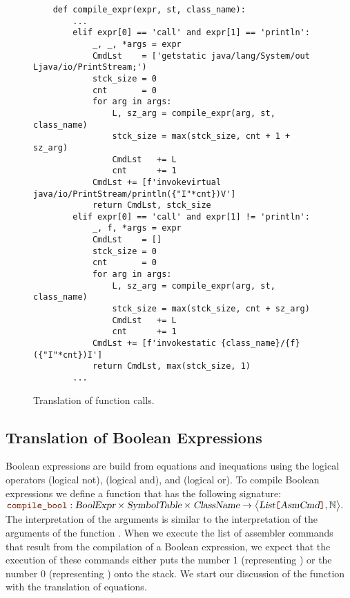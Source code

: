 \begin{figure}[!ht]
\centering
\begin{verbatim}
    def compile_expr(expr, st, class_name):
        ...
        elif expr[0] == 'call' and expr[1] == 'println':
            _, _, *args = expr
            CmdLst    = ['getstatic java/lang/System/out Ljava/io/PrintStream;')
            stck_size = 0
            cnt       = 0
            for arg in args:
                L, sz_arg = compile_expr(arg, st, class_name)
                stck_size = max(stck_size, cnt + 1 + sz_arg)
                CmdLst   += L
                cnt      += 1
            CmdLst += [f'invokevirtual java/io/PrintStream/println({"I"*cnt})V']
            return CmdLst, stck_size
        elif expr[0] == 'call' and expr[1] != 'println':
            _, f, *args = expr
            CmdLst    = []
            stck_size = 0
            cnt       = 0
            for arg in args:
                L, sz_arg = compile_expr(arg, st, class_name)
                stck_size = max(stck_size, cnt + sz_arg)
                CmdLst   += L
                cnt      += 1
            CmdLst += [f'invokestatic {class_name}/{f}({"I"*cnt})I']
            return CmdLst, max(stck_size, 1)
        ...
\end{verbatim}
\vspace*{-0.3cm}
\caption{Translation of function calls.}
\label{fig:Compiler.ipynb:compile:call}
\end{figure}

\subsection{Translation of Boolean Expressions}
Boolean expressions are build from equations and inequations using the logical operators
\qote{!} (logical not), \qote{\&\&} (logical and), and \qote{||} (logical or).
To compile Boolean expressions we define a function
 that has the following signature:
\\[0.2cm]
\hspace*{1.3cm}
$\mytt{compile\_bool}: \textsl{BoolExpr} \times \textsl{SymbolTable} \times \textsl{ClassName} \rightarrow 
                 \bigl\langle\textsl{List}\mytt{[}\textsl{AsmCmd}\mytt{]}, \mathbb{N}\bigr\rangle.$
\\[0.2cm]
The interpretation of the arguments is similar to the interpretation of the arguments
of the function .  
When we execute the list of assembler commands that result from the compilation of a Boolean expression, we
expect that the execution of these commands either puts the number $1$ (representing ) or the
number $0$ (representing ) onto the stack. 
We start our discussion of the function  with the translation of equations.

